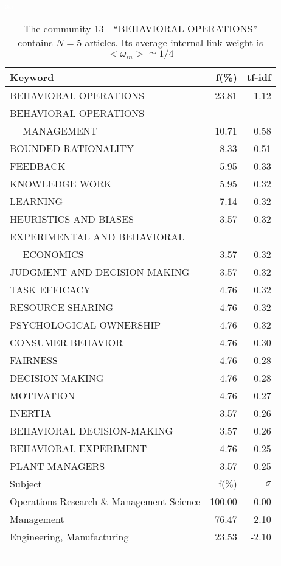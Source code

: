 \documentclass[a4paper,11pt]{report}
\begin{document}
\begin{landscape}
\clearpage

\begin{table}[!ht]
\caption{The community 13 - ``BEHAVIORAL OPERATIONS'' contains $N = 5$ articles. Its average internal link weight is $<\omega_{in}> \simeq 1/4$ }
\textcolor{white}{aa}\\
{\scriptsize\begin{tabular}{|l r  r|}
\hline
Keyword & f(\%) & tf-idf \\
\hline
BEHAVIORAL OPERATIONS & 23.81 & 1.12\\
BEHAVIORAL OPERATIONS &  &\\
$\quad$ MANAGEMENT & 10.71 & 0.58\\
BOUNDED RATIONALITY & 8.33 & 0.51\\
FEEDBACK & 5.95 & 0.33\\
KNOWLEDGE WORK & 5.95 & 0.32\\
LEARNING & 7.14 & 0.32\\
HEURISTICS AND BIASES & 3.57 & 0.32\\
EXPERIMENTAL AND BEHAVIORAL &  &\\
$\quad$ ECONOMICS & 3.57 & 0.32\\
JUDGMENT AND DECISION MAKING & 3.57 & 0.32\\
TASK EFFICACY & 4.76 & 0.32\\
RESOURCE SHARING & 4.76 & 0.32\\
PSYCHOLOGICAL OWNERSHIP & 4.76 & 0.32\\
CONSUMER BEHAVIOR & 4.76 & 0.30\\
FAIRNESS & 4.76 & 0.28\\
DECISION MAKING & 4.76 & 0.28\\
MOTIVATION & 4.76 & 0.27\\
INERTIA & 3.57 & 0.26\\
BEHAVIORAL DECISION-MAKING & 3.57 & 0.26\\
BEHAVIORAL EXPERIMENT & 4.76 & 0.25\\
PLANT MANAGERS & 3.57 & 0.25\\
\hline
\hline
Subject & f(\%) & $\sigma$\\
\hline
Operations Research \& Management Science & 100.00 & 0.00\\
Management & 76.47 & 2.10\\
Engineering, Manufacturing & 23.53 & -2.10\\
 &  & \\
 &  & \\
 &  & \\
 &  & \\

\end{tabular}}
\end{table}
\end{landscape}
\end{document}
